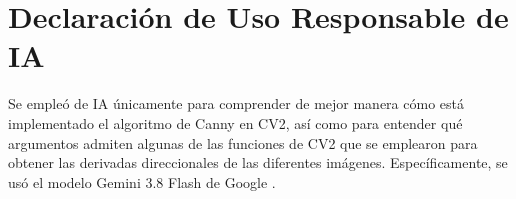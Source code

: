 \section{Declaración de Uso Responsable de IA}
    Se empleó de IA únicamente para comprender de mejor manera 
    cómo está implementado el algoritmo de Canny en CV2, así 
    como para entender qué argumentos admiten algunas de las 
    funciones de CV2 que se emplearon para obtener las derivadas 
    direccionales de las diferentes imágenes. Específicamente, 
    se usó el modelo Gemini 3.8 Flash de Google \parencite{google_gemini_3_8_flash}.